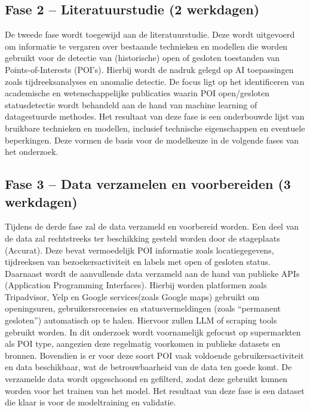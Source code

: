 \subsection{Fase 2 – Literatuurstudie (2 werkdagen)}
De tweede fase wordt toegewijd aan de literatuurstudie. Deze wordt uitgevoerd om informatie te vergaren over bestaande technieken en modellen die worden gebruikt voor de detectie van (historische) open of gesloten toestanden van Points-of-Interests (POI's). Hierbij wordt de nadruk gelegd op AI toepassingen zoals tijdreeksanalyses en anomalie detectie. De focus ligt op het identificeren van academische en wetenschappelijke publicaties waarin POI open/gesloten statusdetectie wordt behandeld aan de hand van machine learning of datagestuurde methodes.
Het resultaat van deze fase is een onderbouwde lijst van bruikbare technieken en modellen, inclusief technische eigenschappen en eventuele beperkingen. Deze vormen de basis voor de modelkeuze in de volgende fases van het onderzoek.

\subsection{Fase 3 – Data verzamelen en voorbereiden (3 werkdagen)}
Tijdens de derde fase zal de data verzameld en voorbereid worden. Een deel van de data zal rechtstreeks ter beschikking gesteld worden door de stageplaats (Accurat). Deze bevat vermoedelijk POI informatie zoals locatiegegevens, tijdreeksen van bezoekersactiviteit en labels met open of gesloten status. Daarnaast wordt de aanvullende data verzameld aan de hand van publieke APIs (Application Programming Interfaces). Hierbij worden platformen zoals Tripadvisor, Yelp en Google services(zoals Google maps) gebruikt om  openingsuren, gebruikersrecensies en statusvermeldingen (zoals “permanent gesloten”) automatisch op te halen. Hiervoor zullen LLM of scraping tools gebruikt worden. In dit onderzoek wordt voornamelijk gefocust op supermarkten  als POI type, aangezien deze regelmatig voorkomen in publieke datasets en bronnen. Bovendien is er voor deze soort POI vaak voldoende gebruikersactiviteit en data beschikbaar, wat de betrouwbaarheid van de data ten goede komt. De verzamelde data wordt opgeschoond en gefilterd, zodat deze gebruikt kunnen worden voor het trainen van het model. Het resultaat van deze fase is een dataset die klaar is voor de modeltraining en validatie.

